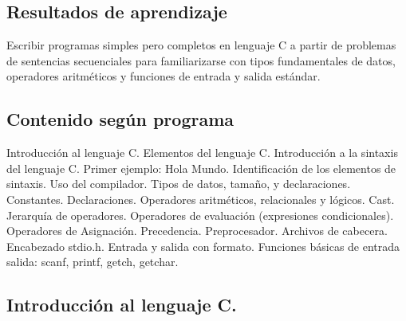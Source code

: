 \subsection*{Resultados de aprendizaje}
Escribir programas simples pero completos en lenguaje C a partir de problemas de sentencias secuenciales para familiarizarse con tipos fundamentales de datos, operadores aritméticos y funciones de entrada y salida estándar.

\subsection*{Contenido según programa}
Introducción al lenguaje C.  Elementos del lenguaje C.  Introducción a la sintaxis del lenguaje C. Primer ejemplo: Hola Mundo. Identificación de los elementos de sintaxis. Uso del compilador. Tipos de datos, tamaño, y declaraciones.  Constantes. Declaraciones.  Operadores aritméticos, relacionales y lógicos. Cast.  Jerarquía de operadores.  Operadores de evaluación (expresiones condicionales).  Operadores de Asignación.  Precedencia.  Preprocesador. Archivos de cabecera. Encabezado stdio.h. Entrada y salida con formato. Funciones básicas de entrada salida: scanf, printf, getch, getchar.

\subsection*{Introducción al lenguaje C.}
\setcounter{subsection}{3}

